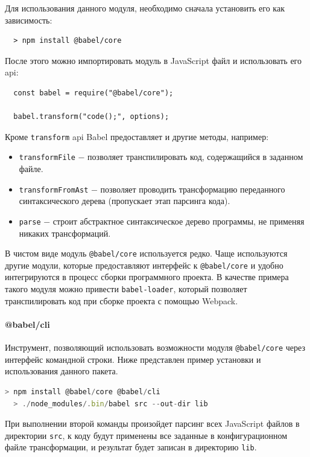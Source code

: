 \documentclass[14pt, a4paper]{article}
\def\code#1{\texttt{#1}} %
\begin{document}
Для использования данного модуля, необходимо сначала установить его как зависимость: 
\begin{lstlisting}
  > npm install @babel/core
\end{lstlisting}
После этого можно импортировать модуль в JavaScript файл и использовать его api:
\begin{lstlisting}
  const babel = require("@babel/core");

  babel.transform("code();", options);
\end{lstlisting}
Кроме \code{transform} api Babel предоставляет и другие методы, например:
\begin{itemize}
  \item \code{transformFile} $-$ позволяет транспилировать код, содержащийся в заданном файле.
  \item \code{transformFromAst} $-$ позволяет проводить трансформацию переданного синтаксического дерева
    (пропускает этап парсинга кода).
  \item \code{parse} $-$ строит абстрактное синтаксическое дерево программы, не применяя никаких 
    трансформаций.
\end{itemize}

В чистом виде модуль \code{@babel/core} используется редко. Чаще используются другие 
модули, которые предоставляют интерфейс к \code{@babel/core} и удобно интегрируются в процесс сборки 
программного проекта. В качестве примера такого модуля можно привести \code{babel-loader}, который 
позволяет транспилировать код при сборке проекта с помощью Webpack.

\paragraph{@babel/cli} \mbox{}

Инструмент, позволяющий использовать возможности модуля \linebreak \code{@babel/core} через интерфейс 
командной строки. Ниже представлен пример установки и использования данного пакета. 
\begin{lstlisting}[language=JavaScript]
  > npm install @babel/core @babel/cli
  > ./node_modules/.bin/babel src --out-dir lib
\end{lstlisting}

При выполнении второй команды произойдет парсинг всех JavaScript файлов в директории \code{src}, 
к коду будут применены все заданные в конфигурационном файле трансформации, и результат будет записан 
в директорию \code{lib}. 
\end{document}
